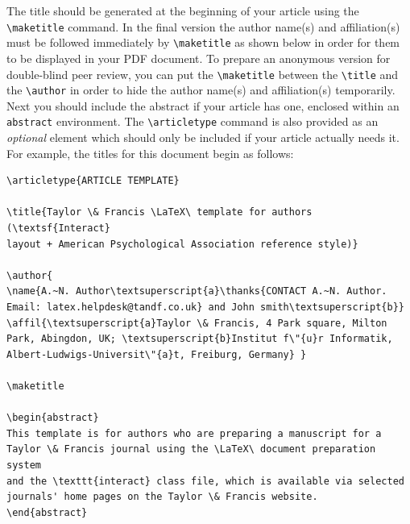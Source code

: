 \documentclass[]{interact}
\theoremstyle{plain}%
\theoremstyle{definition}
\theoremstyle{remark}
\begin{document}
The title should be generated at the beginning of your article using the \verb"\maketitle" command.
In the final version the author name(s) and affiliation(s) must be followed immediately by \verb"\maketitle" as shown below in order for them to be displayed in your PDF document.
To prepare an anonymous version for double-blind peer review, you can put the \verb"\maketitle" between the \verb"\title" and the \verb"\author" in order to hide the author name(s) and affiliation(s) temporarily.
Next you should include the abstract if your article has one, enclosed within an \texttt{abstract} environment.
The \verb"\articletype" command is also provided as an \emph{optional} element which should only be included if your article actually needs it.
For example, the titles for this document begin as follows:
\begin{verbatim}
\articletype{ARTICLE TEMPLATE}

\title{Taylor \& Francis \LaTeX\ template for authors (\textsf{Interact}
layout + American Psychological Association reference style)}

\author{
\name{A.~N. Author\textsuperscript{a}\thanks{CONTACT A.~N. Author.
Email: latex.helpdesk@tandf.co.uk} and John smith\textsuperscript{b}}
\affil{\textsuperscript{a}Taylor \& Francis, 4 Park square, Milton
Park, Abingdon, UK; \textsuperscript{b}Institut f\"{u}r Informatik,
Albert-Ludwigs-Universit\"{a}t, Freiburg, Germany} }

\maketitle

\begin{abstract}
This template is for authors who are preparing a manuscript for a
Taylor \& Francis journal using the \LaTeX\ document preparation system
and the \texttt{interact} class file, which is available via selected
journals' home pages on the Taylor \& Francis website.
\end{abstract}
\end{verbatim}
\end{document}
